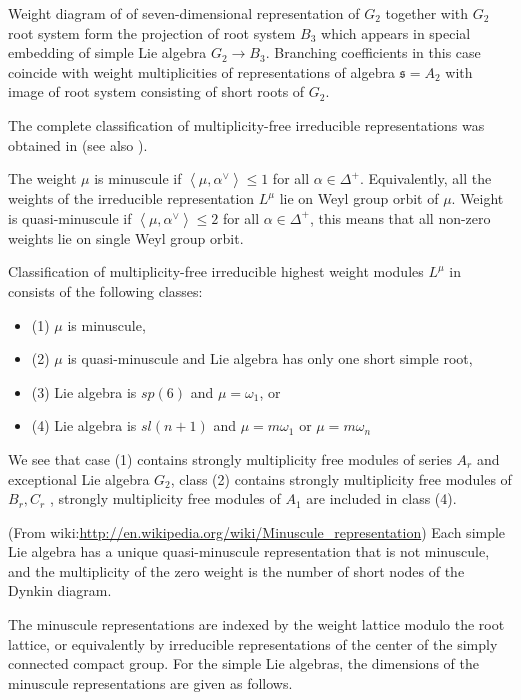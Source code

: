 \documentclass{article}
\newcommand{\sfr}{\mathfrak{s}}
\begin{document}
Weight diagram of of seven-dimensional representation of $G_{2}$ together with $G_{2}$ root system
form the projection of root system $B_{3}$ which appears in special embedding of simple Lie algebra
$G_{2}\to B_{3}$. Branching coefficients in this case coincide with weight multiplicities of
representations of algebra $\sfr=A_{2}$ with image of root system consisting of short roots of
$G_{2}$. 

The complete classification of multiplicity-free irreducible representations was obtained in
\cite{howe1995perspectives} (see also \cite{stembridge2003multiplicity}).


The weight $\mu$ is minuscule if $\left<\mu,\alpha^{\vee}\right>\leq 1$ for all $\alpha\in
\Delta^{+}$. Equivalently, all the weights of the irreducible representation $L^{\mu}$ lie on Weyl
group orbit of $\mu$.  Weight is quasi-minuscule if  $\left<\mu,\alpha^{\vee}\right>\leq 2$ for all $\alpha\in
\Delta^{+}$, this means that all non-zero weights lie on single Weyl group orbit. 

Classification of multiplicity-free irreducible highest weight modules $L^{\mu}$ in
\cite{howe1995perspectives,stembridge2003multiplicity} consists of the following classes:
\begin{itemize}
\item (1) $\mu$ is minuscule,
\item (2) $\mu$ is quasi-minuscule and Lie algebra has only one short simple root,
\item (3) Lie algebra is $sp(6)$ and $\mu=\omega_{1}$, or
\item (4) Lie algebra is $sl(n + 1)$ and  $\mu= m\omega_{1}$ or $\mu  = m\omega_{n}$ 
\end{itemize}

We see that case (1) contains strongly multiplicity free modules of series $A_{r}$ and exceptional
Lie algebra $G_{2}$, class (2) contains strongly multiplicity free modules of $ B_{r}, C_{r}$ ,
strongly multiplicity free modules of $A_{1}$ are included in class (4).

(From wiki:\url{http://en.wikipedia.org/wiki/Minuscule_representation})
Each simple Lie algebra has a unique quasi-minuscule representation that is not minuscule, and the
multiplicity of the zero weight is the number of short nodes of the Dynkin diagram.

The minuscule representations are indexed by the weight lattice modulo the root lattice, or
equivalently by irreducible representations of the center of the simply connected compact group. For
the simple Lie algebras, the dimensions of the minuscule representations are given as follows.
\end{document}
